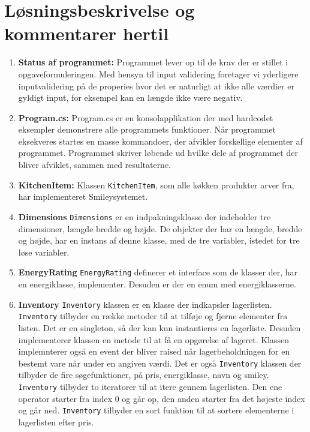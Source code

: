 \documentclass[11pt]{article}
\newcommand{\mono}{\texttt}
\begin{document}
\section{Løsningsbeskrivelse og kommentarer hertil}
\begin{enumerate}
	\item[] \textbf{Status af programmet:}
	Programmet lever op til de krav der er stillet i opgaveformuleringen. Med hensyn til input validering foretager vi yderligere inputvalidering på de properies hvor det er naturligt at ikke alle værdier er gyldigt input, for eksempel kan en længde ikke være negativ. 
	\item[] \textbf{Program.cs:}
	Program.cs er en konsolapplikation der med hardcodet eksempler demonstrere alle programmets funktioner. Når programmet eksekveres startes en masse kommandoer, der afvikler forskellige elementer af programmet. Programmet skriver løbende ud hvilke dele af programmet der bliver afviklet, sammen med resultaterne. 
			
	\item[] \textbf{KitchenItem:} Klassen \mono{KitchenItem}, som alle køkken produkter arver fra, har implementeret Smileysystemet.
		
	\item[] \textbf{Dimensions} \mono{Dimensions} er en indpakningsklasse der indeholder tre dimensioner, længde bredde og højde. De objekter der har en længde, bredde og højde, har en instans af denne klasse, med de tre variabler, istedet for tre løse variabler.  
	
	\item[] \textbf{EnergyRating} \mono{EnergyRating} definerer et interface som de klasser der, har en energiklasse, implementer. Desuden er der en enum med energiklasserne. 	
	
	\item[] \textbf{Inventory} \mono{Inventory} klassen er en klasse der indkapsler lagerlisten. \mono{Inventory} tilbyder en række metoder til at tilføje og fjerne elementer fra listen. Det er en singleton, så der kan kun instantieres en lagerliste. Desuden implementerer klassen en metode til at få en opgørelse af lageret. Klassen implemnterer også en event der bliver raised når lagerbeholdningen for en bestemt vare når under en angiven værdi. Det er også \mono{Inventory} klassen der tilbyder de fire søgefunktioner, på pris, energiklasse, navn og smiley. \mono{Inventory} tilbyder to iteratorer til at itere gennem lagerlisten. Den ene operator starter fra index 0 og går op, den anden starter fra det højeste index og går ned. \mono{Inventory} tilbyder en sort funktion til at sortere elementerne i lagerlisten efter pris.
	

\end{enumerate}
\end{document}
